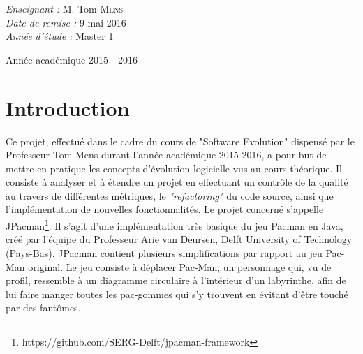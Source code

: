 \documentclass[12pt, openany]{report}
\begin{document}
\begin{titlepage}
\begin{sffamily}
\begin{center}
\begin{minipage}{0.4\textwidth}
\begin{flushleft}
      \end{flushleft}
    \end{minipage}
    \begin{minipage}{0.4\textwidth}
      \begin{flushright} \large
        \emph{Enseignant :} M. Tom  \textsc{Mens}\\
        \emph{Date de remise : } 9 mai 2016\\
        \emph{Année d'étude : } Master 1
      \end{flushright}
    \end{minipage}

    \vfill

    {\large Année académique 2015 - 2016}
	
  \end{center}
  \end{sffamily}
\end{titlepage}




\newpage

	\renewcommand{\thesection}{\arabic{section}}
	\tableofcontents
	\newpage
	\setcounter{secnumdepth}{3}
	\setcounter{tocdepth}{4}
	

\section{Introduction}
Ce projet, effectué dans le cadre du cours de "Software Evolution" dispensé par le Professeur Tom Mens durant l'année académique 2015-2016, a pour but de mettre en pratique les concepts d'évolution logicielle vus au cours théorique. Il consiste à analyser et à étendre un projet en effectuant un contrôle de la qualité au travers de différentes métriques, le \textit{"refactoring"} du code source, ainsi que l'implémentation de nouvelles fonctionnalités. Le projet concerné s'appelle JPacman\footnote{https://github.com/SERG-Delft/jpacman-framework}. Il s'agit d'une implémentation très basique du jeu Pacman en Java, créé par l'équipe  du Professeur Arie van Deursen, Delft University of Technology (Pays-Bas).
 JPacman contient plusieurs simplifications par rapport au jeu Pac-Man original. Le jeu consiste à déplacer Pac-Man, un personnage qui, vu de profil, ressemble à un diagramme circulaire à l’intérieur d’un labyrinthe, afin de lui faire manger toutes les pac-gommes qui s’y trouvent en évitant d’être touché par des fantômes.
 
\end{document}
